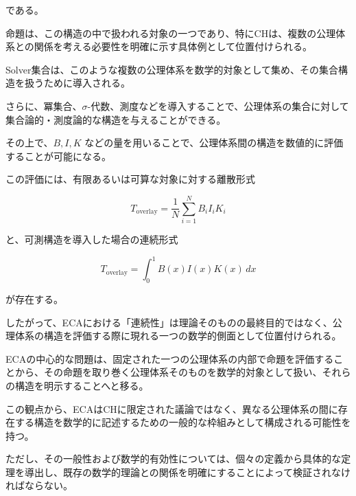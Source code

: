 \documentclass[12pt,a4paper]{article}
\begin{document}
である。

命題は、この構造の中で扱われる対象の一つであり、特にCHは、複数の公理体系との関係を考える必要性を明確に示す具体例として位置付けられる。

Solver集合は、このような複数の公理体系を数学的対象として集め、その集合構造を扱うために導入される。

さらに、冪集合、$\sigma$-代数、測度などを導入することで、公理体系の集合に対して集合論的・測度論的な構造を与えることができる。

その上で、$B,I,K$ などの量を用いることで、公理体系間の構造を数値的に評価することが可能になる。

この評価には、有限あるいは可算な対象に対する離散形式

\[
T_{\mathrm{overlay}}
=
\frac{1}{N}
\sum_{i=1}^{N} B_iI_iK_i
\]

と、可測構造を導入した場合の連続形式

\[
T_{\mathrm{overlay}}
=
\int_0^1B(x)I(x)K(x)\,dx
\]

が存在する。

したがって、ECAにおける「連続性」は理論そのものの最終目的ではなく、公理体系の構造を評価する際に現れる一つの数学的側面として位置付けられる。

ECAの中心的な問題は、固定された一つの公理体系の内部で命題を評価することから、その命題を取り巻く公理体系そのものを数学的対象として扱い、それらの構造を明示することへと移る。

この観点から、ECAはCHに限定された議論ではなく、異なる公理体系の間に存在する構造を数学的に記述するための一般的な枠組みとして構成される可能性を持つ。

ただし、その一般性および数学的有効性については、個々の定義から具体的な定理を導出し、既存の数学的理論との関係を明確にすることによって検証されなければならない。
\end{document}

